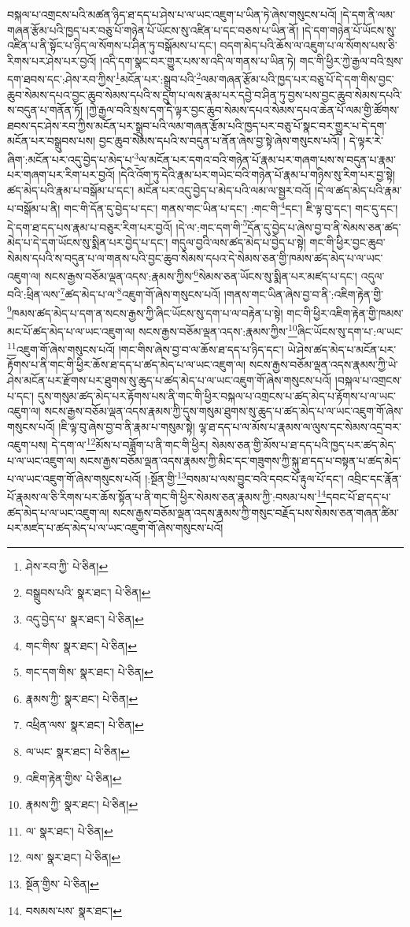 བསྐལ་པ་འགྲངས་པའི་མཚན་ཉིད་ཐ་དད་པ་ཤེས་པ་ལ་ཡང་འཇུག་པ་ཡིན་ཏེ་ཞེས་གསུངས་པའོ། །དེ་དག་ནི་ལམ་གཞན་རྩོམ་པའི་ཁྱད་པར་བཅུ་པོ་གཉེན་པོ་ཡོངས་སུ་འཛིན་པ་དང་བཅས་པ་ཡིན་ནོ། །དེ་དག་གཉེན་པོ་ཡོངས་སུ་འཛིན་པ་ནི་སྟོང་པ་ཉིད་ལ་སོགས་པ་ཤིན་ཏུ་བསྒོམས་པ་དང་། བདག་མེད་པའི་ཆོས་ལ་འཇུག་པ་ལ་སོགས་པས་ཅི་རིགས་པར་ཤེས་པར་བྱའོ། །འདི་དག་སྣང་བར་གྱུར་པས་ས་འདི་ལ་གནས་པ་ཡིན་ཏེ། གང་གི་ཕྱིར་ཀྱེ་རྒྱལ་བའི་སྲས་དག་ཐབས་དང་:ཤེས་རབ་ཀྱིས་\footnote{ཤེས་རབ་ཀྱི་  པེ་ཅིན། }མངོན་པར་:སྒྲུབ་པའི་\footnote{བསྒྲུབས་པའི་  སྣར་ཐང་།  པེ་ཅིན། }ལམ་གཞན་རྩོམ་པའི་ཁྱད་པར་བཅུ་པོ་དེ་དག་གིས་བྱང་ཆུབ་སེམས་དཔའ་བྱང་ཆུབ་སེམས་དཔའི་ས་དྲུག་པ་ལས་རྣམ་པར་དབྱེ་བ་ཤིན་ཏུ་བྱས་པས་བྱང་ཆུབ་སེམས་དཔའི་ས་བདུན་པ་གནོན་ཏོ། །ཀྱེ་རྒྱལ་བའི་སྲས་དག་དེ་ལྟར་བྱང་ཆུབ་སེམས་དཔའ་སེམས་དཔའ་ཆེན་པོ་ལམ་གྱི་ཚོགས་ཐབས་དང་ཤེས་རབ་ཀྱིས་མངོན་པར་སྒྲུབ་པའི་ལམ་གཞན་རྩོམ་པའི་ཁྱད་པར་བཅུ་པོ་སྣང་བར་གྱུར་པ་དེ་དག་མངོན་པར་བསྒྲུབས་པས། བྱང་ཆུབ་སེམས་དཔའི་ས་བདུན་པ་ནོན་ཞེས་བྱ་སྟེ་ཞེས་གསུངས་པའོ། །
དེ་ལྟར་རེ་ཞིག་:མངོན་པར་འདུ་བྱེད་པ་མེད་པ་\footnote{འདུ་བྱེད་པ་  སྣར་ཐང་།  པེ་ཅིན། }ལ་མངོན་པར་དགའ་བའི་གཉེན་པོ་རྣམ་པར་གཞག་པས་ས་བདུན་པ་རྣམ་པར་གཞག་པར་རིག་པར་བྱའོ། །དེའི་འོག་ཏུ་དེའི་རྣམ་པར་གཡེང་བའི་གཉེན་པོ་རྣམ་པ་གཉིས་སུ་རིག་པར་བྱ་སྟེ། ཚད་མེད་པའི་རྣམ་པ་བསྒོམ་པ་དང་། མངོན་པར་འདུ་བྱེད་པ་མེད་པའི་ལམ་ལ་སྦྱར་བའོ། །དེ་ལ་ཚད་མེད་པའི་རྣམ་པ་བསྒོམ་པ་ནི། གང་གི་དོན་དུ་བྱེད་པ་དང་། གནས་གང་ཡིན་པ་དང་། :གང་གི་\footnote{གང་གིས་  སྣར་ཐང་།  པེ་ཅིན། }དང་། ཇི་ལྟ་བུ་དང་། གང་དུ་དང་། དེ་དག་ཐ་དད་པས་རྣམ་པ་བཅུར་རིག་པར་བྱའོ། །དེ་ལ་:གང་དག་གི་\footnote{གང་དག་གིས་  སྣར་ཐང་།  པེ་ཅིན། }དོན་དུ་བྱེད་པ་ཞེས་བྱ་བ་ནི་སེམས་ཅན་ཚད་མེད་པ་དེ་དག་ཡོངས་སུ་སྨིན་པར་བྱེད་པ་དང་། གདུལ་བྱའི་ལས་ཚད་མེད་པ་བྱེད་པ་སྟེ། གང་གི་ཕྱིར་བྱང་ཆུབ་སེམས་དཔའི་ས་བདུན་པ་ལ་གནས་པའི་བྱང་ཆུབ་སེམས་དཔའ་དེ་སེམས་ཅན་གྱི་ཁམས་ཚད་མེད་པ་ལ་ཡང་འཇུག་ལ། སངས་རྒྱས་བཅོམ་ལྡན་འདས་:རྣམས་ཀྱིས་\footnote{རྣམས་ཀྱི་  སྣར་ཐང་།  པེ་ཅིན། }སེམས་ཅན་ཡོངས་སུ་སྨིན་པར་མཛད་པ་དང་། འདུལ་བའི་:ཕྲིན་ལས་\footnote{འཕྲིན་ལས་  སྣར་ཐང་།  པེ་ཅིན། }ཚད་མེད་པ་ལ་\footnote{ལ་ཡང་  སྣར་ཐང་།  པེ་ཅིན། }འཇུག་གོ་ཞེས་གསུངས་པའོ། །གནས་གང་ཡིན་ཞེས་བྱ་བ་ནི་:འཇིག་རྟེན་གྱི་\footnote{འཇིག་རྟེན་གྱིས་  པེ་ཅིན། }ཁམས་ཚད་མེད་པ་དག་ན་སངས་རྒྱས་ཀྱི་ཞིང་ཡོངས་སུ་དག་པ་ལ་བརྟེན་པ་སྟེ། གང་གི་ཕྱིར་འཇིག་རྟེན་གྱི་ཁམས་མང་པོ་ཚད་མེད་པ་ལ་ཡང་འཇུག་ལ། སངས་རྒྱས་བཅོམ་ལྡན་འདས་:རྣམས་ཀྱིས་\footnote{རྣམས་ཀྱི་  སྣར་ཐང་།  པེ་ཅིན། }ཞིང་ཡོངས་སུ་དག་པ་:ལ་ཡང་\footnote{ལ་  སྣར་ཐང་།  པེ་ཅིན། }འཇུག་གོ་ཞེས་གསུངས་པའོ། །གང་གིས་ཞེས་བྱ་བ་ལ་ཆོས་ཐ་དད་པ་ཉིད་དང་། ཡེ་ཤེས་ཚད་མེད་པ་མངོན་པར་རྟོགས་པ་ནི་གང་གི་ཕྱིར་ཆོས་ཐ་དད་པ་ཚད་མེད་པ་ལ་ཡང་འཇུག་ལ། སངས་རྒྱས་བཅོམ་ལྡན་འདས་རྣམས་ཀྱི་ཡེ་ཤེས་མངོན་པར་རྫོགས་པར་ཐུགས་སུ་ཆུད་པ་ཚད་མེད་པ་ལ་ཡང་འཇུག་གོ་ཞེས་གསུངས་པའོ། །བསྐལ་པ་འགྲངས་པ་དང་། དུས་གསུམ་ཚད་མེད་པར་རྟོགས་པས་ནི་གང་གི་ཕྱིར་བསྐལ་པ་འགྲངས་པ་ཚད་མེད་པ་རྟོགས་པ་ལ་ཡང་འཇུག་ལ། སངས་རྒྱས་བཅོམ་ལྡན་འདས་རྣམས་ཀྱི་དུས་གསུམ་ཐུགས་སུ་ཆུད་པ་ཚད་མེད་པ་ལ་ཡང་འཇུག་གོ་ཞེས་གསུངས་པའོ། །ཇི་ལྟ་བུ་ཞེས་བྱ་བ་ནི་རྣམ་པ་གསུམ་སྟེ། ལྷ་ཐ་དད་པ་ལ་མོས་པ་རྣམས་ལ་ལུས་དང་སེམས་འདྲ་བར་འཇུག་པས། དེ་དག་ལ་\footnote{ལས་  སྣར་ཐང་།  པེ་ཅིན། }མོས་པ་བཟློག་པ་ནི་གང་གི་ཕྱིར། སེམས་ཅན་གྱི་མོས་པ་ཐ་དད་པའི་ཁྱད་པར་ཚད་མེད་པ་ལ་ཡང་འཇུག་ལ། སངས་རྒྱས་བཅོམ་ལྡན་འདས་རྣམས་ཀྱི་མིང་དང་གཟུགས་ཀྱི་སྐུ་ཐ་དད་པ་བསྟན་པ་ཚད་མེད་པ་ལ་ཡང་འཇུག་གོ་ཞེས་གསུངས་པའོ། །:སྔོན་གྱི་\footnote{སྔོན་གྱིས་  པེ་ཅིན། }བསམ་པ་ལས་བྱུང་བའི་དབང་པོ་རྟུལ་པོ་དང་། འབྲིང་དང་རྣོན་པོ་རྣམས་ལ་ཅི་རིགས་པར་ཆོས་སྟོན་པ་ནི་གང་གི་ཕྱིར་སེམས་ཅན་རྣམས་ཀྱི་:བསམ་པས་\footnote{བསམས་པས་  སྣར་ཐང་། }དབང་པོ་ཐ་དད་པ་ཚད་མེད་པ་ལ་ཡང་འཇུག་ལ། སངས་རྒྱས་བཅོམ་ལྡན་འདས་རྣམས་ཀྱི་གསུང་བརྗོད་པས་སེམས་ཅན་གཞན་ཚིམ་པར་མཛད་པ་ཚད་མེད་པ་ལ་ཡང་འཇུག་གོ་ཞེས་གསུངས་པའོ། 